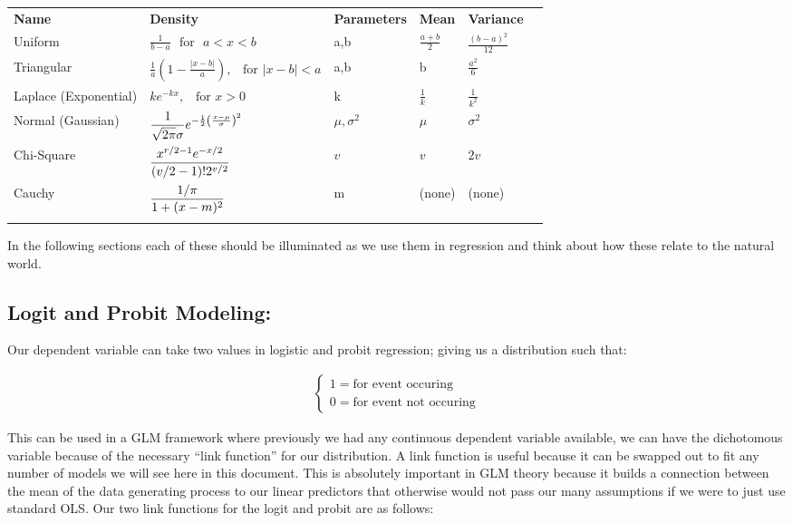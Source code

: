 \documentclass[12pt]{article}\usepackage[]{graphicx}\usepackage[]{color}
\begin{document}
\begin{flushleft}
\begin{longtable}{  m{2.5cm}  m{5.5cm} m{2cm}  m{2cm}  m{2cm}  m{2cm} }
\hline\noalign{\smallskip}
\textbf{Name} & \textbf{Density} & \textbf{Parameters} & \textbf{Mean} & \textbf{Variance} \\
\noalign{\smallskip}\hline\noalign{\smallskip}
Uniform &    $\frac{1}{b-a} \text{~ for~ } a < x < b$ & a,b & $\frac{a +b}{2}$ & $\frac{(b-a)^2}{12}$ \\
Triangular &  $\frac{1}{a} \left( 1- \frac{| x - b |}{a} \right) \text{, ~ for~} |x-b| < a $  &  a,b  &   b  & $\frac{a^2}{6}$  \\
Laplace \hspace{1cm} (Exponential) &   $ke^{-kx} \text{, ~ for~} x > 0 $ &  k  & $\frac{1}{k}$ &  $\frac{1}{k^2}$  \\
Normal (Gaussian) &   $\mathlarger{ \frac{1}{ \sqrt{2 \pi} \sigma} e^{- \frac{1}{2} \left(\frac{x-\mu}{\sigma} \right)^2} }$ &
$\mu, \sigma^2 $ & $\mu$ & $ \sigma^2 $ \\
Chi-Square  & $ \mathlarger{ \frac{x^{r/2-1} e^{-x/2}}{(v/2 - 1)! 2^{v/2}} }$  & $v$ & $v$ & $2v$ \\
Cauchy & $ \mathlarger{ \frac{1/\pi}{1+ (x-m)^2} }$ & m & (none) & (none)\\
\noalign{\smallskip}\hline\noalign{\smallskip}
\end{longtable}

In the following sections each of these should be illuminated as we use them in regression and think about how these relate to the natural world.




\clearpage
\subsection{Logit and Probit Modeling:}

Our dependent variable can take two values in logistic and probit regression; giving us a distribution such that:

\begin{gather*}
\begin{cases}
  1 = \text{for event occuring}    \\
  0 = \text{for event not occuring}
\end{cases}
\end{gather*}

This can be used in a GLM framework where previously we had any continuous dependent variable available, we can have the dichotomous variable because of the necessary ``link function'' for our distribution. A link function is useful because it can be swapped out to fit any number of models we will see here in this document. This is absolutely important in GLM theory because it builds a connection between the mean of the data generating process to our linear predictors that otherwise would not pass our many assumptions if we were to just use standard OLS. Our two link functions for the logit and probit are as follows:


\end{flushleft}
\end{document}
